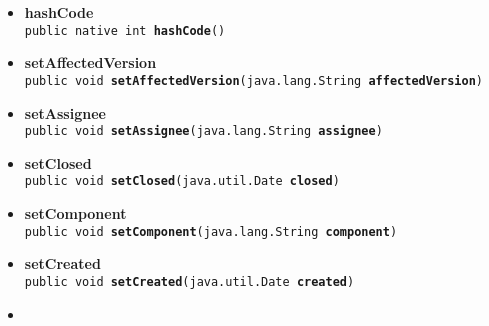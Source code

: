 {{{\begin{itemize}
{\texttt{public java.util.Date\ {\bf  getUpdated}()
\label{it.unisa.sesa.repominer.db.entities.Issue.getUpdated()}}%
}%
\item{ 
\hypertarget{it.unisa.sesa.repominer.db.entities.Issue.hashCode()}{{\bf  hashCode}\\}
\texttt{public native int\ {\bf  hashCode}()
\label{it.unisa.sesa.repominer.db.entities.Issue.hashCode()}}%
}%
\item{ 
\hypertarget{it.unisa.sesa.repominer.db.entities.Issue.setAffectedVersion(java.lang.String)}{{\bf  setAffectedVersion}\\}
\texttt{public void\ {\bf  setAffectedVersion}(\texttt{java.lang.String} {\bf  affectedVersion})
\label{it.unisa.sesa.repominer.db.entities.Issue.setAffectedVersion(java.lang.String)}}%
}%
\item{ 
\hypertarget{it.unisa.sesa.repominer.db.entities.Issue.setAssignee(java.lang.String)}{{\bf  setAssignee}\\}
\texttt{public void\ {\bf  setAssignee}(\texttt{java.lang.String} {\bf  assignee})
\label{it.unisa.sesa.repominer.db.entities.Issue.setAssignee(java.lang.String)}}%
}%
\item{ 
\hypertarget{it.unisa.sesa.repominer.db.entities.Issue.setClosed(java.util.Date)}{{\bf  setClosed}\\}
\texttt{public void\ {\bf  setClosed}(\texttt{java.util.Date} {\bf  closed})
\label{it.unisa.sesa.repominer.db.entities.Issue.setClosed(java.util.Date)}}%
}%
\item{ 
\hypertarget{it.unisa.sesa.repominer.db.entities.Issue.setComponent(java.lang.String)}{{\bf  setComponent}\\}
\texttt{public void\ {\bf  setComponent}(\texttt{java.lang.String} {\bf  component})
\label{it.unisa.sesa.repominer.db.entities.Issue.setComponent(java.lang.String)}}%
}%
\item{ 
\hypertarget{it.unisa.sesa.repominer.db.entities.Issue.setCreated(java.util.Date)}{{\bf  setCreated}\\}
\texttt{public void\ {\bf  setCreated}(\texttt{java.util.Date} {\bf  created})
\label{it.unisa.sesa.repominer.db.entities.Issue.setCreated(java.util.Date)}}%
}%
\item{ 
}
\end{itemize}}}}
